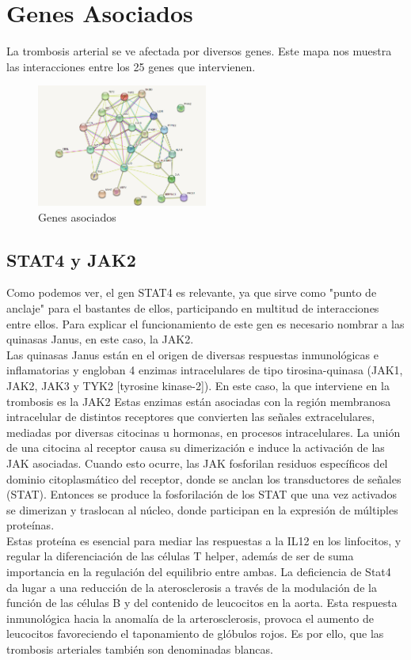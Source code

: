 \section{Genes Asociados}
		La trombosis arterial se ve afectada por diversos genes. Este mapa nos muestra las interacciones entre los 25 genes que intervienen.\\
		
    \begin{figure}
        \centering
    	\includegraphics[width=0.50\textwidth]{figures/genes_asociados.png}
    	\caption{Genes asociados}
    	\label{fig:example2}
      \end{figure}
      
\subsection{STAT4 y JAK2}
          Como podemos ver, el gen STAT4 es relevante, ya que sirve como "punto de anclaje" para el bastantes de ellos, participando en multitud de interacciones entre ellos. Para explicar el funcionamiento de este gen es necesario nombrar a las quinasas Janus, en este caso, la JAK2.\\
		
		Las quinasas Janus están en el origen de diversas respuestas inmunológicas e inflamatorias y engloban 4 enzimas intracelulares de tipo tirosina-quinasa (JAK1, JAK2, JAK3 y TYK2 [tyrosine kinase-2]). En este caso, la que interviene en la trombosis es la JAK2 Estas enzimas están asociadas con la región membranosa intracelular de distintos receptores que convierten las señales extracelulares, mediadas por diversas citocinas u hormonas, en procesos intracelulares. La unión de una citocina al receptor causa su dimerización e induce la activación de las JAK asociadas. Cuando esto ocurre, las JAK fosforilan residuos específicos del dominio citoplasmático del receptor, donde se anclan los transductores de señales (STAT). Entonces se produce la fosforilación de los STAT que una vez activados se dimerizan y traslocan al núcleo, donde participan en la expresión de múltiples proteínas.\\
		
		Estas proteína es esencial para mediar las respuestas a la IL12 en los linfocitos, y regular la diferenciación de las células T helper, además de ser de suma importancia en la regulación del equilibrio entre ambas.  La deficiencia de Stat4 da lugar a una reducción de la aterosclerosis a través de la modulación de la función de las células B y del contenido de leucocitos en la aorta. Esta respuesta inmunológica hacia la anomalía de la arterosclerosis, provoca el aumento de leucocitos favoreciendo el taponamiento de glóbulos rojos. Es por ello, que las trombosis arteriales también son denominadas blancas.
	
